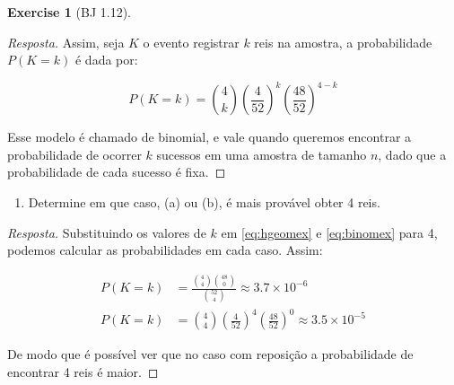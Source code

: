 \documentclass[
]{article}
\providecommand{\tightlist}{%
  \setlength{\itemsep}{0pt}\setlength{\parskip}{0pt}}
\theoremstyle{definition}
\theoremstyle{definition}
\theoremstyle{definition}
\newtheorem{exercise}{Exercise}[section]
\theoremstyle{definition}
\theoremstyle{remark}
\begin{document}
\begin{exercise}[BJ 1.12]
\begin{proof}[Resposta]
Assim, seja \(K\) o evento registrar \(k\) reis na amostra, a probabilidade \(P(K=k)\) é dada por:

\begin{equation}
P(K=k) = \binom{4}{k} \left(\frac{4}{52}\right)^{k} \left(\frac{48}{52}\right)^{4-k}
\label{eq:binomex}
\end{equation}

Esse modelo é chamado de binomial, e vale quando queremos encontrar a probabilidade de ocorrer \(k\) sucessos em uma amostra de tamanho \(n\), dado que a probabilidade de cada sucesso é fixa.
\end{proof}

\begin{enumerate}
\def\labelenumi{\alph{enumi})}
\setcounter{enumi}{2}
\tightlist
\item
  Determine em que caso, (a) ou (b), é mais provável obter 4 reis.
\end{enumerate}

\begin{proof}[Resposta]
Substituindo os valores de \(k\) em \eqref{eq:hgeomex} e \eqref{eq:binomex} para 4, podemos calcular as probabilidades em cada caso. Assim:

\begin{align*}
P(K=k) &= \frac{\binom{4}{4}\binom{48}{0}}{\binom{52}{4}} \approx 3.7 \times 10^{-6} \\
P(K=k) &= \binom{4}{4} \left(\frac{4}{52}\right)^{4} \left(\frac{48}{52}\right)^{0} \approx 3.5 \times 10^{-5}
\end{align*}

De modo que é possível ver que no caso com reposição a probabilidade de encontrar 4 reis é maior.
\end{proof}

\end{exercise}
\end{document}
